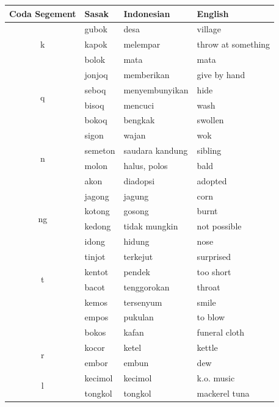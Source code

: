 \documentclass[12pt]{ouparticle}
\begin{document}
\begin{table}[]
    \centering
    \begin{tabular}{c|l l l}
    Coda Segement & Sasak & Indonesian & English  \\
    \hline
    \multirow{3}{*}{k} & gubok & desa & village\\
                       & kapok & melempar & throw at something\\
                       & bolok & mata & mata\\
    \hline
    \multirow{4}{*}{q} & jonjoq & memberikan & give by hand\\
                       & seboq & menyembunyikan & hide\\
                       & bisoq & mencuci & wash\\
                       & bokoq & bengkak   & swollen \\
    \hline
    \multirow{4}{*}{n} & sigon & wajan & wok\\
                       & semeton & saudara kandung & sibling\\
                       & molon & halus, polos & bald\\
                       & akon & diadopsi   & adopted \\
    \hline
    \multirow{4}{*}{ng} & jagong & jagung & corn\\
                       & kotong & gosong & burnt\\
                       & kedong & tidak mungkin & not possible\\
                       & idong & hidung   & nose \\
    \hline
    \multirow{4}{*}{t} & tinjot & terkejut & surprised\\
                       & kentot & pendek & too short\\
                       & bacot & tenggorokan & throat\\
    \hline
    \multirow{3}{*}{s} & kemos & tersenyum & smile\\
                       & empos & pukulan & to blow\\
                       & bokos & kafan & funeral cloth\\
    \hline
    \multirow{2}{*}{r} & kocor & ketel & kettle\\
                       & embor & embun & dew\\
    \hline
    \multirow{3}{*}{l} & kecimol & kecimol & k.o. music\\
                       & tongkol & tongkol & mackerel tuna\\

\end{tabular}
\end{table}
\end{document}
